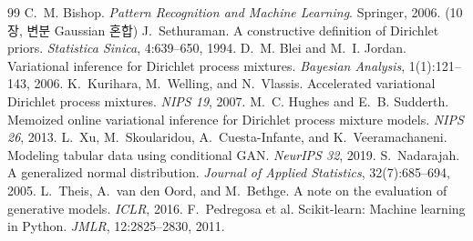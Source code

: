 \documentclass[11pt]{article}
\begin{document}
\begin{thebibliography}{99}\small
{} C.~M. Bishop. \emph{Pattern Recognition and Machine Learning}. Springer, 2006. (10장, 변분 Gaussian 혼합)
 J.~Sethuraman. A constructive definition of Dirichlet priors. \emph{Statistica Sinica}, 4:639--650, 1994.
 D.~M. Blei and M.~I. Jordan. Variational inference for Dirichlet process mixtures. \emph{Bayesian Analysis}, 1(1):121--143, 2006.
 K.~Kurihara, M.~Welling, and N.~Vlassis. Accelerated variational Dirichlet process mixtures. \emph{NIPS 19}, 2007.
 M.~C. Hughes and E.~B. Sudderth. Memoized online variational inference for Dirichlet process mixture models. \emph{NIPS 26}, 2013.
 L.~Xu, M.~Skoularidou, A.~Cuesta-Infante, and K.~Veeramachaneni. Modeling tabular data using conditional GAN. \emph{NeurIPS 32}, 2019.
 S.~Nadarajah. A generalized normal distribution. \emph{Journal of Applied Statistics}, 32(7):685--694, 2005.
 L.~Theis, A.~van den Oord, and M.~Bethge. A note on the evaluation of generative models. \emph{ICLR}, 2016.
 F.~Pedregosa et al. Scikit-learn: Machine learning in Python. \emph{JMLR}, 12:2825--2830, 2011.
\end{thebibliography}
\end{document}
